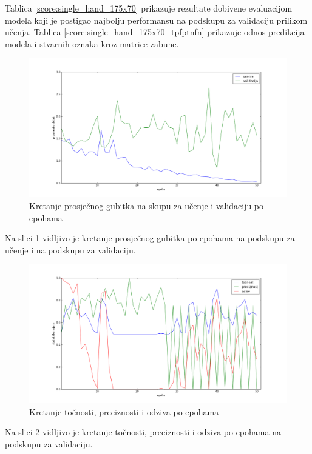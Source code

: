 \documentclass[times, utf8, diplomski, numeric]{fer}
\begin{document}
\noindent Tablica \ref{score:single_hand_175x70} prikazuje rezultate dobivene evaluacijom modela koji je postigao najbolju performansu na podskupu za validaciju prilikom učenja.
Tablica \ref{score:single_hand_175x70_tpfptnfn} prikazuje odnos predikcija modela i stvarnih oznaka kroz matrice zabune.

\begin{figure}[H]
\centering
\includegraphics[scale=0.35]{images/single_hand_scale025_loss.png}
\caption{Kretanje prosječnog gubitka na skupu za učenje i validaciju po epohama}
\label{img:single_hand_scale025_loss}
\end{figure}
\noindent Na slici \ref{img:single_hand_scale025_loss} vidljivo je kretanje prosječnog gubitka po epohama na podskupu za učenje i na podskupu za validaciju.

\begin{figure}[H]
\centering
\includegraphics[scale=0.35]{images/single_hand_scale025_acc_ap.png}
\caption{Kretanje točnosti, preciznosti i odziva po epohama}
\label{img:single_hand_scale025_acc_ap}
\end{figure}
\noindent Na slici \ref{img:single_hand_scale025_acc_ap} vidljivo je kretanje točnosti, preciznosti i odziva po epohama na podskupu za validaciju.
\end{document}
